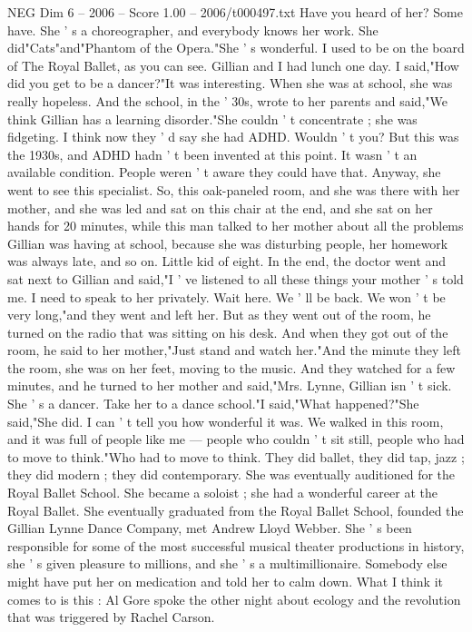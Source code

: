 \begin{textsample}{NEG Dim 6 – 2006 – Score 1.00 – 2006/t000497.txt}
Have you heard of her?
Some have.
She ' s a choreographer, and everybody knows her work.
She did"Cats"and"Phantom of the Opera."She ' s wonderful.
I used to be on the board of The Royal Ballet, as you can see.
Gillian and I had lunch one day.
I said,"How did you get to be a dancer?"It was interesting.
When she was at school, she was really hopeless.
And the school, in the ' 30s, wrote to her parents and said,"We think Gillian has a learning disorder."She couldn ' t concentrate ; she was fidgeting.
I think now they ' d say she had ADHD.
Wouldn ' t you?
But this was the 1930s, and ADHD hadn ' t been invented at this point.
It wasn ' t an available condition.
People weren ' t aware they could have that.
Anyway, she went to see this specialist.
So, this oak-paneled room, and she was there with her mother, and she was led and sat on this chair at the end, and she sat on her hands for 20 minutes, while this man talked to her mother about all the problems Gillian was having at school, because she was disturbing people, her homework was always late, and so on.
Little kid of eight.
In the end, the doctor went and sat next to Gillian and said,"I ' ve listened to all these things your mother ' s told me.
I need to speak to her privately.
Wait here.
We ' ll be back.
We won ' t be very long,"and they went and left her.
But as they went out of the room, he turned on the radio that was sitting on his desk.
And when they got out of the room, he said to her mother,"Just stand and watch her."And the minute they left the room, she was on her feet, moving to the music.
And they watched for a few minutes, and he turned to her mother and said,"Mrs.
Lynne, Gillian isn ' t sick.
She ' s a dancer.
Take her to a dance school."I said,"What happened?"She said,"She did.
I can ' t tell you how wonderful it was.
We walked in this room, and it was full of people like me — people who couldn ' t sit still, people who had to move to think."Who had to move to think.
They did ballet, they did tap, jazz ; they did modern ; they did contemporary.
She was eventually auditioned for the Royal Ballet School.
She became a soloist ; she had a wonderful career at the Royal Ballet.
She eventually graduated from the Royal Ballet School, founded the Gillian Lynne Dance Company, met Andrew Lloyd Webber.
She ' s been responsible for some of the most successful musical theater productions in history, she ' s given pleasure to millions, and she ' s a multimillionaire.
Somebody else might have put her on medication and told her to calm down.
What I think it comes to is this : Al Gore spoke the other night about ecology and the revolution that was triggered by Rachel Carson.

\end{textsample}
